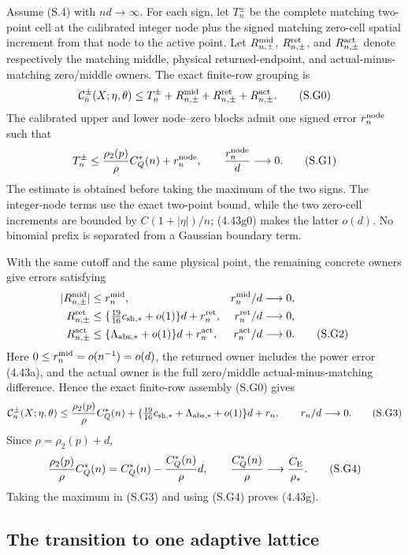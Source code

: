\documentclass[11pt,a4paper]{article}
\numberwithin{equation}{section}
\theoremstyle{definition}
\theoremstyle{remark}
\newcommand{\CE}{C_{\mathrm E}}
\begin{document}
Assume (S.4) with $nd\to\infty$.  For each sign, let $T_n^\pm$ be the
complete matching two-point cell at the calibrated integer node plus the
signed matching zero-cell spatial increment from that node to the active
point.  Let $R_{n,\pm}^{\rm mid}$, $R_{n,\pm}^{\rm ret}$, and
$R_{n,\pm}^{\rm act}$ denote respectively the matching middle, physical
returned-endpoint, and actual-minus-matching zero/middle owners.  The exact
finite-row grouping is
\[
 \mathcal C_n^\pm(X;\eta,\theta)
 \le T_n^\pm+R_{n,\pm}^{\rm mid}
       +R_{n,\pm}^{\rm ret}+R_{n,\pm}^{\rm act}.          \tag{S.G0}
\]
The calibrated upper and lower node--zero blocks admit one signed error
$r_n^{\rm node}$ such that
\[
 T_n^\pm\le {\rho_2(p)\over\rho}C_Q^*(n)+r_n^{\rm node},
 \qquad {r_n^{\rm node}\over d}\longrightarrow0.          \tag{S.G1}
\]
The estimate is obtained before taking the maximum of the two signs.  The
integer-node terms use the exact two-point bound, while the two zero-cell
increments are bounded by $C(1+|\eta|)/n$; (4.43g0) makes the latter
$o(d)$.  No binomial prefix is separated from a Gaussian boundary term.

With the same cutoff and the same physical point, the remaining concrete
owners give errors satisfying
\begin{align}
 |R_{n,\pm}^{\rm mid}|&\le r_n^{\rm mid},&
 r_n^{\rm mid}/d&\longrightarrow0,\notag\\
 R_{n,\pm}^{\rm ret}
   &\le\{\tfrac{19}{16}c_{\rm sh,*}+o(1)\}d+r_n^{\rm ret},
       &r_n^{\rm ret}/d&\longrightarrow0,\notag\\
 R_{n,\pm}^{\rm act}
   &\le\{\Lambda_{\rm abs,*}+o(1)\}d+r_n^{\rm act},
       &r_n^{\rm act}/d&\longrightarrow0.                   \tag{S.G2}
\end{align}
Here $0\le r_n^{\rm mid}=o(n^{-1})=o(d)$, the returned owner includes the
power error (4.43a), and the actual owner is the full zero/middle
actual-minus-matching difference.  Hence the exact finite-row assembly
(S.G0) gives
\[
 \mathcal C_n^\pm(X;\eta,\theta)
 \le {\rho_2(p)\over\rho}C_Q^*(n)
 +\{\tfrac{19}{16}c_{\rm sh,*}
       +\Lambda_{\rm abs,*}+o(1)\}d+r_n,
 \qquad r_n/d\longrightarrow0.                              \tag{S.G3}
\]
Since $\rho=\rho_2(p)+d$,
\[
 {\rho_2(p)\over\rho}C_Q^*(n)
 =C_Q^*(n)-{C_Q^*(n)\over\rho}d,\qquad
 {C_Q^*(n)\over\rho}\longrightarrow{\CE\over\rho_*}.    \tag{S.G4}
\]
Taking the maximum in (S.G3) and using (S.G4) proves (4.43g).

\subsection*{The transition to one adaptive lattice}
\end{document}
